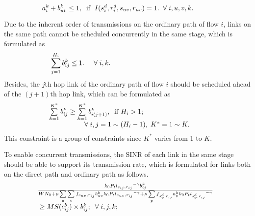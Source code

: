 \documentclass[journal]{IEEEtran}
\begin{document}
\begin{equation}
a_i^k + b_{uv}^k \le 1,\;\;{\rm{if}} \;\;I(s_i^d,r_i^d,s_{uv},r_{uv})=1. \;\;\forall
\;i,u,v,k.\hspace{1.0cm}\label{CONS9}
\end{equation}

Due to the inherent order of transmissions on the ordinary path of flow $i$, links on the same path
cannot be scheduled concurrently in the same stage, which is formulated as
\begin{equation}
\sum\limits_{j = 1}^{{H_i}} {b_{ij}^k \le 1}. \;\;\;\;\;\forall\;i,k. \hspace{4.8cm}\label{CONS6}
\end{equation}
Besides, the $j$th hop link of the ordinary path of flow $i$ should be scheduled ahead of the
${(j+1)}$th hop link, which can be formulated as
\begin{equation}
\begin{array}{l}\hspace{-0.8cm}
\sum\limits_{k = 1}^{{K^*}} {b_{ij}^k}  \ge \sum\limits_{k = 1}^{{K^*}} {b_{i(j + 1)}^k},\;\;{\rm{if}}\;H_i>1;\\
\hspace{1.0cm}\forall\;i,j = 1 \sim ({H_{i}} - 1), \;{K^*} =1 \sim K.
\end{array}\label{CONS10}
\end{equation}
This constraint is a group of constraints since $K^*$ varies from 1 to $K$.

To enable concurrent transmissions, the SINR of each link in the same stage should be able to
support its transmission rate, which is formulated for links both on the direct path and ordinary
path as follows.
\begin{equation}
\begin{array}{l}\hspace{-0.2cm}
\frac{{{k_0}{P_t}{l_{{s_{ij}},{r_{ij}}}}^{ - \gamma }b_{ij}^k}}{{W{N_0} + \rho \sum\limits_u
{\sum\limits_v {{f_{{s_{uv}},{r_{ij}}}}b_{uv}^k{k_0}{P_t}{l_{{s_{uv}},{r_{ij}}}}^{ - \gamma } +
\rho \sum\limits_p {{f_{s_p^d,{r_{ij}}}}a_p^k{k_0}{P_t}{l_{s_p^d,{r_{ij}}}}^{ - \gamma }} } } }}
\\\hspace{-0.1cm}\ge  MS({c_{ij}^b}) \times b_{ij}^k;\;\;\forall \;i,j,k;
\end{array}\label{CONS11}
\end{equation}
\end{document}
